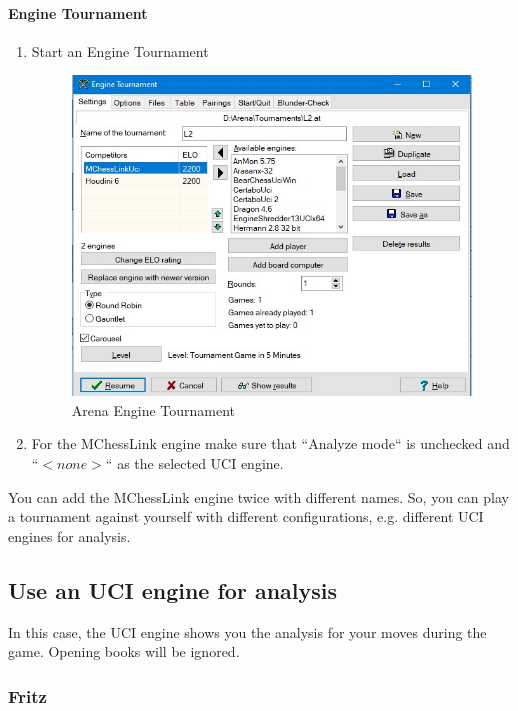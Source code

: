 \documentclass[11pt,a4paper]{article}
\begin{document}
\paragraph{Engine Tournament}
\begin{enumerate}
\item Start an Engine Tournament
  \begin{figure}[H]
	\centering
	\includegraphics[scale=0.7]{arena_enginetournament.jpg}
	\caption{Arena Engine Tournament}
	\label{fig:ArenaEngineTournament}
\end{figure}
\item For the MChessLink engine make sure that ``Analyze mode`` is unchecked and  ``\begin{math} <none> \end{math}`` as the selected UCI engine.
\end{enumerate}
You can add the MChessLink engine twice with different names. So, you can play a tournament against yourself with different configurations, e.g. different UCI engines for analysis.

\subsection{Use an UCI engine for analysis}
In this case, the UCI engine shows you the analysis for your moves during the game. Opening books will be ignored.
\subsubsection{Fritz}
\end{document}
